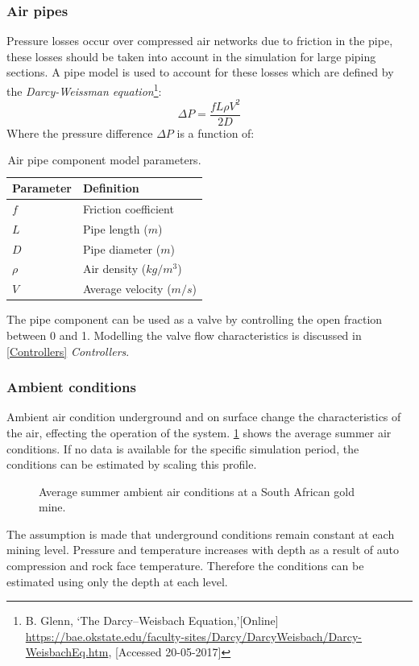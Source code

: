 		\subsubsection{Air pipes}
		Pressure losses occur over compressed air networks due to friction in the pipe, these losses should be taken into account in the simulation for large piping sections. A pipe model is used to account for these losses which are defined by the \textit{Darcy-Weissman equation}\footnote{ B. Glenn, \enquote*{The Darcy–Weisbach Equation,}[Online] \url{https://bae.okstate.edu/faculty-sites/Darcy/DarcyWeisbach/Darcy-WeisbachEq.htm}, [Accessed 20-05-2017]}:
		$$\Delta P = \frac{f  L \rho V^2}{2 D}$$
		Where the pressure difference $\Delta P $ is a function of:
		\begin{table}[h]
			\centering
			\begin{tabular}{ll}
				\hline
				Parameter & Definition\\
				\hline
				$f$ & Friction coefficient  \\
				$L$ & Pipe length ($m$) \\
				$D$ & Pipe diameter ($m$) \\
				$\rho$ & Air density ($kg/m^3$)\\	
				$V$ & Average velocity ($m/s$) \\	
				\hline
			\end{tabular} 
		\caption{Air pipe component model parameters.}
		\label{table: Darcy-Weisbach}
		\end{table}
		
		The pipe component can be used as a valve by controlling the open fraction between 0 and 1. Modelling the valve flow characteristics is discussed in \cref{Controllers} \textit{Controllers}.
		\subsubsection{Ambient conditions}
		Ambient air condition underground and on surface change the characteristics of the air, effecting the operation of the system. \cref{fig: Ambient} shows the average summer air conditions. If no data is available for the specific simulation period, the conditions can be estimated by scaling this profile. 
		\begin{figure}[h]
			\centering
			\fbox{}
			\caption{Average summer ambient air conditions at a South African gold mine.}
			\label{fig: Ambient}
		\end{figure}
		The assumption is made that underground conditions remain constant at each mining level. Pressure and temperature increases with depth as a result of auto compression and rock face temperature. Therefore the conditions can be estimated using only the depth at each level.   
